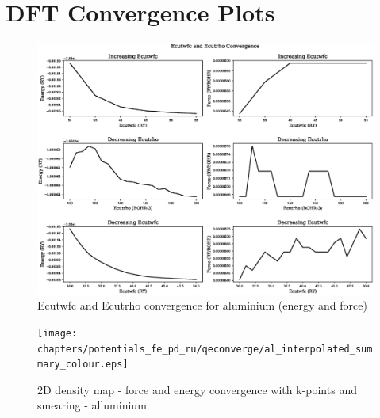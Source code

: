 \chapter{DFT Convergence Plots}
\label{section:dftconvplots}

\clearpage

\begin{landscape}
\FloatBarrier
\begin{figure}
    \begin{center}
        \includegraphics[scale=0.70]{chapters/potentials_fe_pd_ru/qeconverge/al_ecut_convergence_ry.eps}
        \caption{Ecutwfc and Ecutrho convergence for aluminium (energy and force)}
      \label{image:aluminiumecut}
    \end{center}
\end{figure}
\FloatBarrier
\end{landscape}

\clearpage

\begin{landscape}
\FloatBarrier
\begin{figure}
    \begin{center}
        \texttt{[image: chapters/potentials\_fe\_pd\_ru/qeconverge/al\_interpolated\_summary\_colour.eps]}
        \caption{2D density map - force and energy convergence with k-points and smearing - alluminium}
      \label{image:aluminiumkpointsmearing}
    \end{center}
\end{figure}
\FloatBarrier
\end{landscape}

\clearpage

